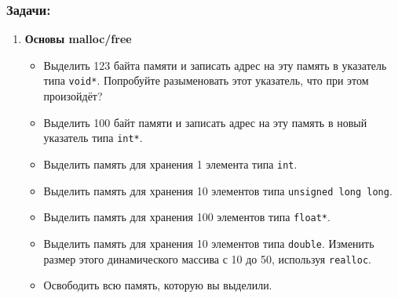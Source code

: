 \documentclass{article}
\begin{document}
\subsubsection*{Задачи:}
\begin{enumerate}
\item \textbf{Основы malloc/free}
\begin{itemize}
\item Выделить 123 байта памяти и записать адрес на эту память в указатель типа \texttt{void*}. Попробуйте разыменовать этот указатель, что при этом произойдёт?
\item Выделить 100 байт памяти и записать адрес на эту память в новый указатель типа \texttt{int*}.
\item Выделить память для хранения 1 элемента типа \texttt{int}.
\item Выделить память для хранения 10 элементов типа \texttt{unsigned long long}.
\item Выделить память для хранения 100 элементов типа \texttt{float*}.
\item Выделить память для хранения 10 элементов типа \texttt{double}. Изменить размер этого динамического массива с 10 до 50, используя \texttt{realloc}.
\item Освободить всю память, которую вы выделили.
\end{itemize}


\end{enumerate}


\newpage
\end{document}
